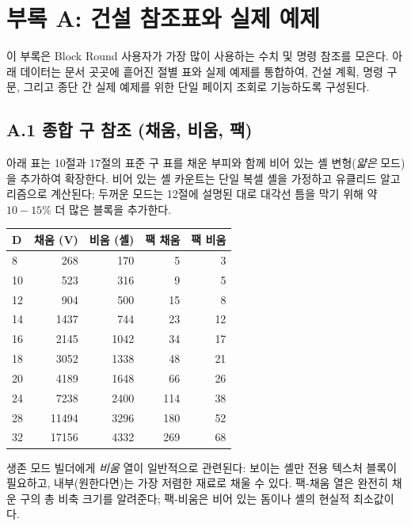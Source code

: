 \documentclass[12pt,a4paper]{scrartcl}
\begin{document}
\clearpage

\section*{\color{accent}부록 A: 건설 참조표와 실제 예제}

이 부록은 Block Round 사용자가 가장 많이 사용하는 수치 및 명령 참조를 모은다. 아래 데이터는 문서 곳곳에 흩어진 절별 표와 실제 예제를 통합하여, 건설 계획, 명령 구문, 그리고 종단 간 실제 예제를 위한 단일 페이지 조회로 기능하도록 구성된다.

\subsection*{A.1 종합 구 참조 (채움, 비움, 팩)}
아래 표는 10절과 17절의 표준 구 표를 채운 부피와 함께 비어 있는 셸 변형(\emph{얇은} 모드)을 추가하여 확장한다. 비어 있는 셸 카운트는 단일 복셀 셸을 가정하고 유클리드 알고리즘으로 계산된다; 두꺼운 모드는 12절에 설명된 대로 대각선 틈을 막기 위해 약 $10{-}15\%$ 더 많은 블록을 추가한다.

\vspace{0.4em}
\begin{center}
\begin{tabular}{@{}lrrrr@{}}
\toprule
\textbf{D} & \textbf{채움 (V)} & \textbf{비움 (셸)} & \textbf{팩 채움} & \textbf{팩 비움} \\
\midrule
8   &   268 &   170 &  5  &  3  \\
10  &   523 &   316 &  9  &  5  \\
12  &   904 &   500 & 15  &  8  \\
14  &  1437 &   744 & 23  & 12  \\
16  &  2145 &  1042 & 34  & 17  \\
18  &  3052 &  1338 & 48  & 21  \\
20  &  4189 &  1648 & 66  & 26  \\
24  &  7238 &  2400 & 114 & 38  \\
28  & 11494 &  3296 & 180 & 52  \\
32  & 17156 &  4332 & 269 & 68  \\
\bottomrule
\end{tabular}
\end{center}

생존 모드 빌더에게 \emph{비움} 열이 일반적으로 관련된다: 보이는 셸만 전용 텍스처 블록이 필요하고, 내부(원한다면)는 가장 저렴한 재료로 채울 수 있다. 팩-채움 열은 완전히 채운 구의 총 비축 크기를 알려준다; 팩-비움은 비어 있는 돔이나 셸의 현실적 최소값이다.
\end{document}
